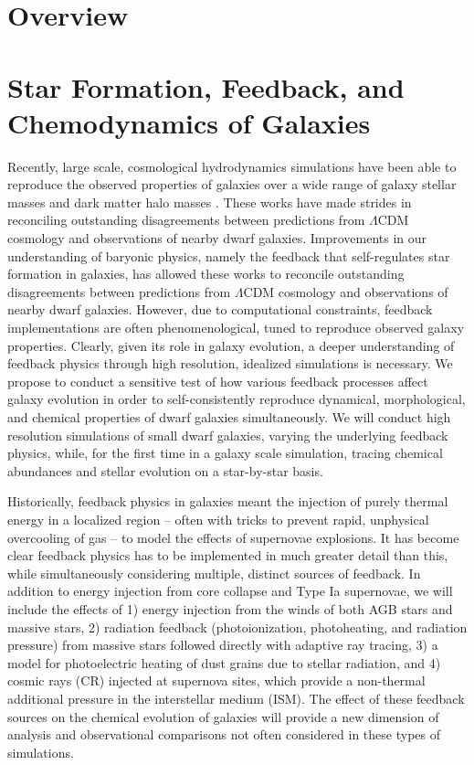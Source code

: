 \documentclass[11pt]{article}
\newcommand{\eg}{e.g.,}
\begin{document}
\maketitle

\section{Overview}

\section{Star Formation, Feedback, and Chemodynamics of Galaxies}

Recently, large scale, cosmological hydrodynamics simulations have been able to reproduce the observed properties of galaxies over a wide range of galaxy stellar masses and dark matter halo masses \citep[\eg][]{MUGS2010, MAGICC2013, Illustris1, Illustris2, OWLS, EAGLE, FIRE, APOSTLE, Latte}. These works have made strides in reconciling outstanding disagreements between predictions from $\Lambda$CDM cosmology and observations of nearby dwarf galaxies. Improvements in our understanding of baryonic physics, namely the feedback that self-regulates star formation in galaxies, has allowed these works to reconcile outstanding disagreements between predictions from $\Lambda$CDM cosmology and observations of nearby dwarf galaxies. However, due to computational constraints, feedback implementations are often phenomenological, tuned to reproduce observed galaxy properties. Clearly, given its role in galaxy evolution, a deeper understanding of feedback physics through high resolution, idealized simulations is necessary. We propose to conduct a sensitive test of how various feedback processes affect galaxy evolution in order to self-consistently reproduce dynamical, morphological, and chemical properties of dwarf galaxies simultaneously. We will conduct high resolution simulations of small dwarf galaxies, varying the underlying feedback physics, while, for the first time in a galaxy scale simulation, tracing chemical abundances and stellar evolution on a star-by-star basis.

Historically, feedback physics in galaxies meant the injection of purely thermal energy in a localized region -- often with tricks to prevent rapid, unphysical overcooling of gas -- to model the effects of supernovae explosions. It has become clear feedback physics has to be implemented in much greater detail than this, while simultaneously considering multiple, distinct sources of feedback. In addition to energy injection from core collapse and Type Ia supernovae, we will include the effects of 1) energy injection from the winds of both AGB stars and massive stars, 2) radiation feedback (photoionization, photoheating, and radiation pressure) from massive stars followed directly with adaptive ray tracing, 3) a model for photoelectric heating of dust grains due to stellar radiation, and 4) cosmic rays (CR) injected at supernova sites, which provide a non-thermal additional pressure in the interstellar medium (ISM). The effect of these feedback sources on the chemical evolution of galaxies will provide a new dimension of analysis and observational comparisons not often considered in these types of simulations.
\end{document}
